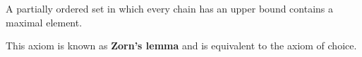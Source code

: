 A partially ordered set in which every chain has an upper bound contains a maximal element.

This axiom is known as \textbf{Zorn's lemma} and is equivalent to the axiom of choice.
